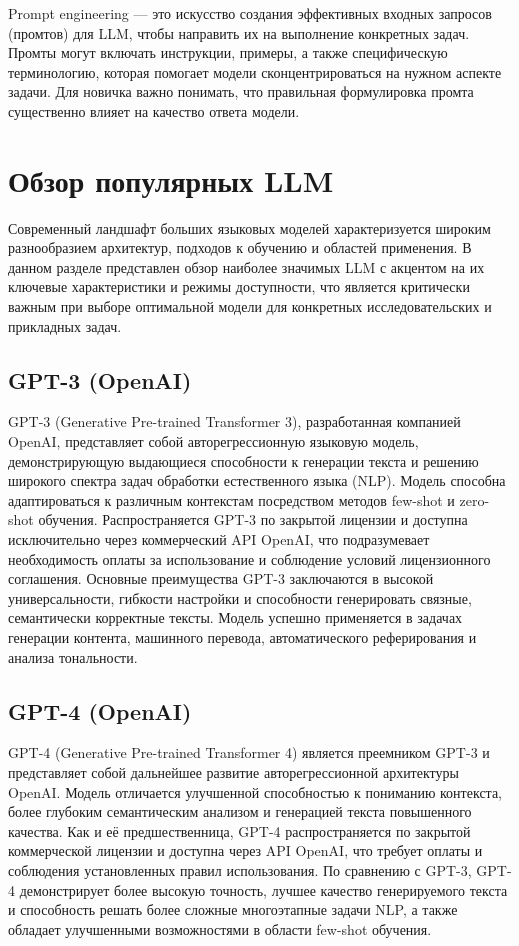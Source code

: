Prompt engineering — это искусство создания эффективных входных запросов (промтов) для LLM, чтобы направить их на выполнение конкретных задач. 
Промты могут включать инструкции, примеры, а также специфическую терминологию, которая помогает модели сконцентрироваться на нужном аспекте задачи. 
Для новичка важно понимать, что правильная формулировка промта существенно влияет на качество ответа модели.

\section{Обзор популярных LLM}

Современный ландшафт больших языковых моделей характеризуется широким разнообразием архитектур, подходов к обучению и областей применения. В данном разделе представлен обзор наиболее значимых LLM с акцентом на их ключевые характеристики и режимы доступности, что является критически важным при выборе оптимальной модели для конкретных исследовательских и прикладных задач.

\subsection{GPT-3 (OpenAI)}

GPT-3 (Generative Pre-trained Transformer 3), разработанная компанией OpenAI, представляет собой авторегрессионную языковую модель, демонстрирующую выдающиеся способности к генерации текста и решению широкого спектра задач обработки естественного языка (NLP). Модель способна адаптироваться к различным контекстам посредством методов few-shot и zero-shot обучения. Распространяется GPT-3 по закрытой лицензии и доступна исключительно через коммерческий API OpenAI, что подразумевает необходимость оплаты за использование и соблюдение условий лицензионного соглашения. Основные преимущества GPT-3 заключаются в высокой универсальности, гибкости настройки и способности генерировать связные, семантически корректные тексты. Модель успешно применяется в задачах генерации контента, машинного перевода, автоматического реферирования и анализа тональности.

\subsection{GPT-4 (OpenAI)}

GPT-4 (Generative Pre-trained Transformer 4) является преемником GPT-3 и представляет собой дальнейшее развитие авторегрессионной архитектуры OpenAI. Модель отличается улучшенной способностью к пониманию контекста, более глубоким семантическим анализом и генерацией текста повышенного качества. Как и её предшественница, GPT-4 распространяется по закрытой коммерческой лицензии и доступна через API OpenAI, что требует оплаты и соблюдения установленных правил использования. По сравнению с GPT-3, GPT-4 демонстрирует более высокую точность, лучшее качество генерируемого текста и способность решать более сложные многоэтапные задачи NLP, а также обладает улучшенными возможностями в области few-shot обучения.

